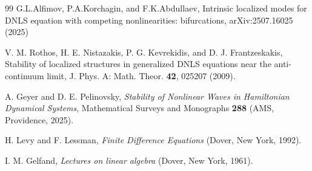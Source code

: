 \documentclass[12pt,reqno]{amsart}
\begin{document}
\begin{thebibliography}{99}
%
 G.L.Alfimov, P.A.Korchagin, and F.K.Abdullaev, Intrinsic localized modes for DNLS equation with competing nonlinearities: bifurcations,	arXiv:2507.16025 (2025)
%

 V. M. Rothos, H. E. Nistazakis, P. G. Kevrekidis, and D. J. Frantzeskakis, Stability of localized structures in generalized DNLS equations near the anti-continuum limit, J. Phys. A: Math. Theor. {\bf 42},  025207 (2009).


 A. Geyer and D. E. Pelinovsky, {\em Stability of Nonlinear Waves in Hamiltonian Dynamical Systems}, Mathematical Surveys and Monographs {\bf 288} (AMS, Providence, 2025).

 H. Levy and F. Lessman, {\em Finite Difference Equations} 
(Dover, New York, 1992).

 I. M. Gelfand, {\em Lectures on linear algebra} 
(Dover, New York, 1961).
\end{thebibliography}
\end{document}
